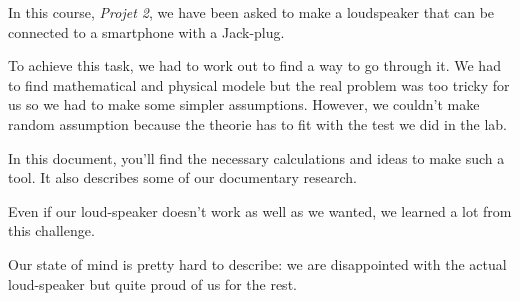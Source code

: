 

\begin{abstract-en}

In this course, \textit{Projet 2}, we have been asked to make a loudspeaker that can be connected to a smartphone with a Jack-plug.

To achieve this task, we had to work out to find a way to go through it.
We had to find mathematical and physical modele but the real problem was too tricky for us so we had to make some simpler assumptions.
However, we couldn't make random assumption because the theorie has to fit with the test we did in the lab.

In this document, you'll find the necessary calculations and ideas to make such a tool. It also describes some
of our documentary research.

Even if our loud-speaker doesn't work as well as we wanted, we learned a lot from this challenge. 

Our state of mind is pretty hard to describe: we are disappointed with the actual loud-speaker but quite proud of us for the rest.

\end{abstract-en}



